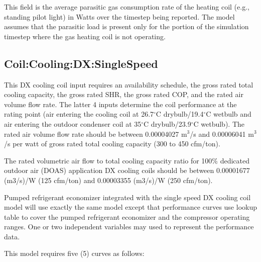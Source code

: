 This field is the average parasitic gas consumption rate of the heating coil (e.g., standing pilot light) in Watts over the timestep being reported. The model assumes that the parasitic load is present only for the portion of the simulation timestep where the gas heating coil is not operating.

\subsection{Coil:Cooling:DX:SingleSpeed}\label{coilcoolingdxsinglespeed}

This DX cooling coil input requires an availability schedule, the gross rated total cooling capacity, the gross rated SHR, the gross rated COP, and the rated air volume flow rate. The latter 4 inputs determine the coil performance at the rating point (air entering the cooling coil at 26.7$^\circ$C drybulb/19.4$^\circ$C wetbulb and air entering the outdoor condenser coil at 35$^\circ$C drybulb/23.9$^\circ$C wetbulb). The rated air volume flow rate should be between 0.00004027 m\(^{3}\)/s and 0.00006041 m\(^{3}\)/s per watt of gross rated total cooling capacity (300 to 450 cfm/ton).

The rated volumetric air flow to total cooling capacity ratio for 100\% dedicated outdoor air (DOAS) application DX cooling coils should be between 0.00001677 (m3/s)/W (125 cfm/ton) and 0.00003355 (m3/s)/W (250 cfm/ton).

Pumped refrigerant economizer integrated with the single speed DX cooling coil model will use exactly the same model except that performance curves use lookup table to cover the pumped refrigerant economizer and the compressor operating ranges. One or two independent variables may used to represent the performance data.

This model requires five (5) curves as follows:

